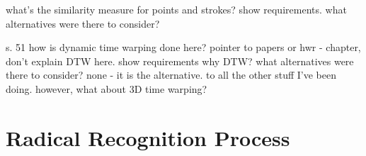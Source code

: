 what's the similarity measure for
points and strokes?
show requirements.
what alternatives were there to consider?

s. 51
how is dynamic time warping done here?
pointer to papers or hwr - chapter, don't explain DTW here.
show requirements
why DTW?
what alternatives were there to consider?
none - it is the alternative.
to all the other stuff I've been doing.
however, what about 3D time warping?


\section{Radical Recognition Process}
\label{sec:hwre:radicalrecognitionprocess}






    


